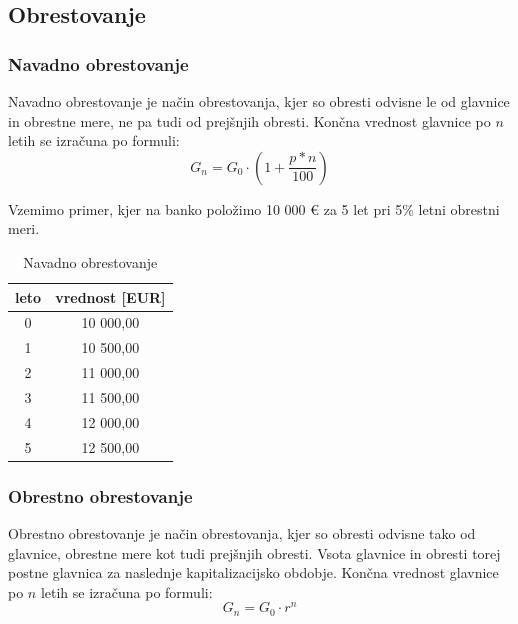 \documentclass[12pt]{article}
\begin{document}
    \subsection{Obrestovanje}
        \subsubsection{Navadno obrestovanje}
        Navadno obrestovanje je način obrestovanja, kjer so obresti odvisne le od glavnice
        in obrestne mere, ne pa tudi od prejšnjih obresti. Končna vrednost glavnice po $n$
        letih se izračuna po formuli:
        \begin{equation}
            G_n = G_0 \cdot (1 + \frac{p*n}{100})
        \end{equation}

        Vzemimo primer, kjer na banko položimo 10 000 € za 5 let pri 5\% letni obrestni meri. 
        \begin{center}
            \begin{table}[h!]
                \centering
                \begin{tabular}{|c|c|}
                    \hline
                    \textbf{leto} & \textbf{vrednost [EUR]} \\ \hline
                    0 & 10 000,00 \\ \hline
                    1 & 10 500,00 \\ \hline
                    2 & 11 000,00 \\ \hline
                    3 & 11 500,00 \\ \hline
                    4 & 12 000,00 \\ \hline
                    5 & 12 500,00 \\ \hline
                \end{tabular}
                \caption{Navadno obrestovanje}
            \end{table}
        \end{center}

        \subsubsection{Obrestno obrestovanje}
        Obrestno obrestovanje je način obrestovanja, kjer so obresti odvisne tako od 
        glavnice, obrestne mere kot tudi prejšnjih obresti. Vsota glavnice in obresti torej 
        postne glavnica za naslednje kapitalizacijsko obdobje. Končna vrednost glavnice 
        po $n$ letih se izračuna po formuli:
        \begin{equation}
            G_n = G_0 \cdot r^n
        \end{equation}
\end{document}
